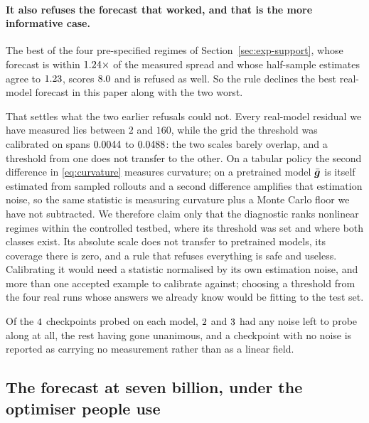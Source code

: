 \paragraph{It also refuses the forecast that worked, and that is the more informative case.} The
best of the four pre-specified regimes of Section~\ref{sec:exp-support}, whose forecast is within
$1.24\times$ of the measured spread and whose half-sample estimates agree to
$1.23$, scores $8.0$ and is refused as well. So the rule declines the
best real-model forecast in this paper along with the two worst.

That settles what the two earlier refusals could not. Every real-model residual we have measured
lies between $2$ and $160$, while the grid the threshold was calibrated on spans
$0.0044$ to $0.0488$: the two scales barely overlap, and a threshold from one does not
transfer to the other. On a tabular policy the second difference in \eqref{eq:curvature} measures
curvature; on a pretrained model $\bar{\bm{g}}$ is itself estimated from sampled rollouts and a second
difference amplifies that estimation noise, so the same statistic is measuring curvature plus a
Monte Carlo floor we have not subtracted. We therefore claim only that the diagnostic ranks
nonlinear regimes within the controlled testbed, where its threshold was set and where both
classes exist. Its absolute scale does not transfer to pretrained models, its coverage there is
zero, and a rule that refuses everything is safe and useless. Calibrating it would need a
statistic normalised by its own estimation noise, and more than one accepted example to calibrate
against; choosing a threshold from the four real runs whose answers we already know would be
fitting to the test set.

Of the $4$ checkpoints probed on each model, $2$
and $3$ had any noise left to probe along at all, the rest having gone
unanimous, and a checkpoint with no noise is reported as carrying no measurement rather than as a
linear field.

\subsection{The forecast at seven billion, under the optimiser people use}
\label{sec:exp-adam-scale}

